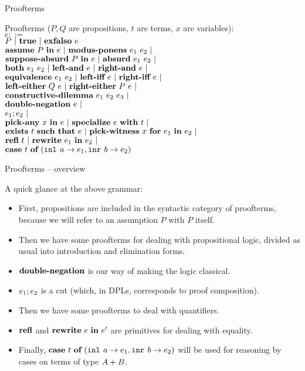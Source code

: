 \documentclass{beamer}
\begin{document}
\begin{frame}{Proofterms}

Proofterms ($P, Q$ are propositions, $t$ are terms, $x$ are variables): \\
$e ::=$ \\
\qquad $P \ |\  \textbf{true} \ |\  \textbf{exfalso}\ e$ \\
\qquad $\textbf{assume}\ P\ \textbf{in}\ e \ |\  \textbf{modus-ponens}\ e_1\ e_2 \ |\ $ \\
\qquad $\textbf{suppose-absurd}\ P\ \textbf{in}\ e \ |\  \textbf{absurd}\ e_1\ e_2 \ |\ $ \\
\qquad $\textbf{both}\ e_1\ e_2 \ |\  \textbf{left-and}\ e \ |\  \textbf{right-and}\ e \ |\ $ \\
\qquad $\textbf{equivalence}\ e_1\ e_2 \ |\  \textbf{left-iff}\ e \ |\  \textbf{right-iff}\ e \ |\ $ \\
\qquad $\orintrol[Q]{e} \pipe \orintror[P]{e} \pipe$ \\
\qquad $\textbf{constructive-dilemma}\ e_1\ e_2\ e_3 \ |\ $ \\
\qquad $\dn[e] \pipe$ \\
\qquad $e_1; e_2 \ |\ $ \\
\qquad $\allintro{x}{e} \pipe \allelim{e}{t} \pipe$ \\
\qquad $\exintro{t}{e} \pipe \exelim{x}{e_1}{e_2} \pipe$ \\
\qquad $\refl[t] \pipe \rewrite{e_1}{e_2} \pipe$ \\
\qquad $\textbf{case}\ t\ \textbf{of}\ (\texttt{inl}_{}\ a \rightarrow e_1, \texttt{inr}_{}\ b \rightarrow e_2)$

\end{frame}

\begin{frame}{Proofterms -- overview}

A quick glance at the above grammar:

\begin{itemize}
  \item First, propositions are included in the syntactic category of proofterms, because we will refer to an assumption $P$ with $P$ itself.
  \item Then we have some proofterms for dealing with propositional logic, divided as usual into introduction and elimination forms.
  \item $\dn$ is our way of making the logic classical.
  \item $e_1; e_2$ is a cut (which, in DPLs, corresponds to proof composition).
  \item Then we have some proofterms to deal with quantifiers.
  \item $\refl$ and $\textbf{rewrite}\ e\ \textbf{in}\ e'$ are primitives for dealing with equality.
  \item Finally, $\textbf{case}\ t\ \textbf{of}\ (\texttt{inl}_{}\ a \rightarrow e_1, \texttt{inr}_{}\ b \rightarrow e_2)$ will be used for reasoning by cases on terms of type $A + B$.
\end{itemize}

\end{frame}
\end{document}
